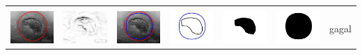 \begin{table}[H]
\begin{tabular}{|m{0.7in}|m{0.7in}|m{0.7in}|m{0.7in}|m{0.7in}|m{0.7in}|m{0.7in}|}
		&  &  & & & &  \\
		\includegraphics[width=0.7in]{dataset/dataset_3/luka_merah/ready/32_integer_init.jpg}&
		\includegraphics[width=0.7in]{dataset/dataset_3/luka_merah/ready/32_integer_ext.jpg}&
		\includegraphics[width=0.7in]{dataset/dataset_3/luka_merah/ready/32_integer_result.jpg}&
		\includegraphics[width=0.7in]{dataset/dataset_3/luka_merah/ready/32_gt_r_integer.jpg}&
		\includegraphics[width=0.7in]{dataset/dataset_3/luka_merah/ready/32_r.jpg}&
		\includegraphics[width=0.7in]{dataset/dataset_3/luka_merah/ready/32_integer_r.jpg}&
		gagal\\
		\hline
		

\end{tabular}
\end{table}
